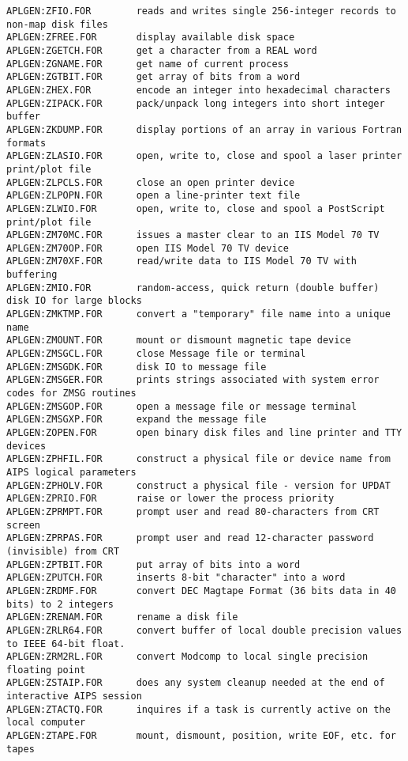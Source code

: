 \begin{verbatim}
APLGEN:ZFIO.FOR        reads and writes single 256-integer records to non-map disk files
APLGEN:ZFREE.FOR       display available disk space
APLGEN:ZGETCH.FOR      get a character from a REAL word
APLGEN:ZGNAME.FOR      get name of current process
APLGEN:ZGTBIT.FOR      get array of bits from a word
APLGEN:ZHEX.FOR        encode an integer into hexadecimal characters
APLGEN:ZIPACK.FOR      pack/unpack long integers into short integer buffer
APLGEN:ZKDUMP.FOR      display portions of an array in various Fortran formats
APLGEN:ZLASIO.FOR      open, write to, close and spool a laser printer print/plot file
APLGEN:ZLPCLS.FOR      close an open printer device
APLGEN:ZLPOPN.FOR      open a line-printer text file
APLGEN:ZLWIO.FOR       open, write to, close and spool a PostScript print/plot file
APLGEN:ZM70MC.FOR      issues a master clear to an IIS Model 70 TV
APLGEN:ZM70OP.FOR      open IIS Model 70 TV device
APLGEN:ZM70XF.FOR      read/write data to IIS Model 70 TV with buffering
APLGEN:ZMIO.FOR        random-access, quick return (double buffer) disk IO for large blocks
APLGEN:ZMKTMP.FOR      convert a "temporary" file name into a unique name
APLGEN:ZMOUNT.FOR      mount or dismount magnetic tape device
APLGEN:ZMSGCL.FOR      close Message file or terminal
APLGEN:ZMSGDK.FOR      disk IO to message file
APLGEN:ZMSGER.FOR      prints strings associated with system error codes for ZMSG routines
APLGEN:ZMSGOP.FOR      open a message file or message terminal
APLGEN:ZMSGXP.FOR      expand the message file
APLGEN:ZOPEN.FOR       open binary disk files and line printer and TTY devices
APLGEN:ZPHFIL.FOR      construct a physical file or device name from AIPS logical parameters
APLGEN:ZPHOLV.FOR      construct a physical file - version for UPDAT
APLGEN:ZPRIO.FOR       raise or lower the process priority
APLGEN:ZPRMPT.FOR      prompt user and read 80-characters from CRT screen
APLGEN:ZPRPAS.FOR      prompt user and read 12-character password (invisible) from CRT
APLGEN:ZPTBIT.FOR      put array of bits into a word
APLGEN:ZPUTCH.FOR      inserts 8-bit "character" into a word
APLGEN:ZRDMF.FOR       convert DEC Magtape Format (36 bits data in 40 bits) to 2 integers
APLGEN:ZRENAM.FOR      rename a disk file
APLGEN:ZRLR64.FOR      convert buffer of local double precision values to IEEE 64-bit float.
APLGEN:ZRM2RL.FOR      convert Modcomp to local single precision floating point
APLGEN:ZSTAIP.FOR      does any system cleanup needed at the end of interactive AIPS session
APLGEN:ZTACTQ.FOR      inquires if a task is currently active on the local computer
APLGEN:ZTAPE.FOR       mount, dismount, position, write EOF, etc. for tapes

\end{verbatim}
